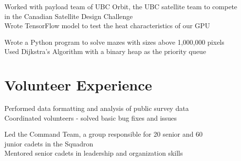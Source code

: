 \documentclass[]{deedy-resume-openfont}
\begin{document}
     Worked with payload team of UBC Orbit, the UBC satellite team to compete \\ in the Canadian Satellite Design Challenge \\
     Wrote TensorFlow model to test the heat characteristics of our GPU 

    \sectionsep
    
    
     Wrote a Python program to solve mazes with sizes above 1,000,000 pixels\\
     Used Dijkstra’s Algorithm with a binary heap as the priority queue

    \sectionsep
    
    
    \section{Volunteer Experience}
    
     Performed data formatting and analysis of public survey data\\
     Coordinated volunteers - solved basic bug fixes and issues

    \sectionsep
    
    
     Led the Command Team, a group responsible for 20 senior and 60 \\  junior cadets in the Squadron \\
     Mentored senior cadets in leadership and organization skills

    \sectionsep
    
\end{document}

